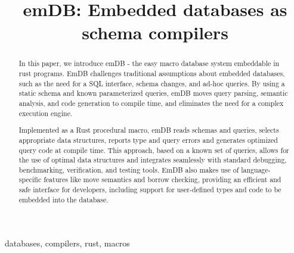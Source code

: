 \documentclass[conference]{IEEEtran}
\begin{document}
\title{emDB: Embedded databases as schema compilers %
}

\author{
    \and
    \and
}

\maketitle

\begin{abstract}
    In this paper, we introduce emDB - the easy macro database system embeddable in rust programs.
    EmDB challenges traditional assumptions about embedded databases, such as the
    need for a SQL interface, schema changes, and ad-hoc queries. By using a static schema and known
    parameterized queries, emDB moves query parsing, semantic analysis, and code generation to compile
    time, and eliminates the need for a complex execution engine.

    Implemented as a Rust procedural macro, emDB reads schemas and queries, selects appropriate data
    structures, reports type and query errors and generates optimized query code at compile time.
    This approach, based on a known set of queries, allows for the use of optimal data structures
    and integrates seamlessly with standard debugging, benchmarking, verification, and testing tools.
    EmDB also makes use of language-specific features like move semantics and borrow checking, providing
    an efficient and safe interface for developers, including support for user-defined types and code to be embedded
    into the database.
\end{abstract}

\begin{IEEEkeywords}
    databases, compilers, rust, macros
\end{IEEEkeywords}
\end{document}
